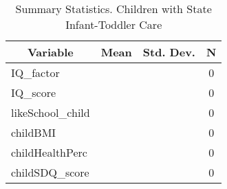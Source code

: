 
\begin{table}[htbp]\centering \caption{Summary Statistics. Children with State Infant-Toddler Care \label{schoolChildasiloStat}}
\begin{tabular}{l c c  c}\hline\hline
\multicolumn{1}{c}{\textbf{Variable}} & \textbf{Mean}
 & \textbf{Std. Dev.} & \textbf{N}\\ \hline
IQ\_factor &  &   & 0\\
IQ\_score &  &   & 0\\
likeSchool\_child &  &   & 0\\
childBMI &  &   & 0\\
childHealthPerc &  &   & 0\\
childSDQ\_score &  &   & 0\\
\hline\end{tabular}
\end{table}
